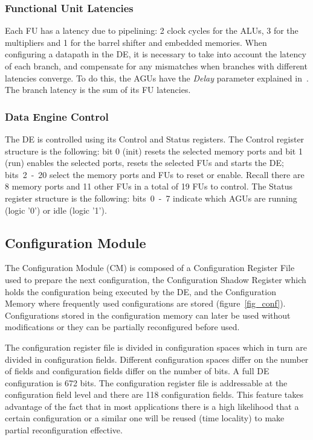 \documentclass[journal]{IEEEtran}
\begin{document}
\subsubsection{Functional Unit Latencies}
\label{subsection:functionalUnitLatencies}

Each FU has a latency due to pipelining: 2 clock cycles for the ALUs,
3 for the multipliers and 1 for the barrel shifter and embedded
memories. When configuring a datapath in the DE, it is necessary to
take into account the latency of each branch, and compensate for any
mismatches when branches with different latencies converge. To do
this, the AGUs have the {\em Delay} parameter explained
in~\cite{Lopes2017}. The branch latency is the sum of its FU
latencies.

\subsubsection{Data Engine Control}
\label{subsection:dataEngineControl}

The DE is controlled using its Control and Status registers. The
Control register structure is the following: bit 0 (init) resets the
selected memory ports and bit 1 (run) enables the selected ports,
resets the selected FUs and starts the DE; bits~2~-~20 select the
memory ports and FUs to reset or enable. Recall there are 8 memory
ports and 11 other FUs in a total of 19 FUs to control. The Status
register structure is the following: bits~0~-~7 indicate which AGUs
are running (logic '0') or idle (logic '1').

\subsection{Configuration Module}
\label{section:configuration}

The Configuration Module (CM) is composed of a Configuration Register
File used to prepare the next configuration, the Configuration Shadow
Register which holds the configuration being executed by the DE, and
the Configuration Memory where frequently used configurations are
stored (figure~\ref{fig_conf}). Configurations stored in the
configuration memory can later be used without modifications or they
can be partially reconfigured before used.

The configuration register file is divided in configuration spaces
which in turn are divided in configuration fields. Different
configuration spaces differ on the number of fields and configuration
fields differ on the number of bits. A full DE configuration is 672
bits. The configuration register file is addressable at the
configuration field level and there are 118 configuration fields. This
feature takes advantage of the fact that in most applications there is
a high likelihood that a certain configuration or a similar one will
be reused (time locality) to make partial reconfiguration effective.
\end{document}
